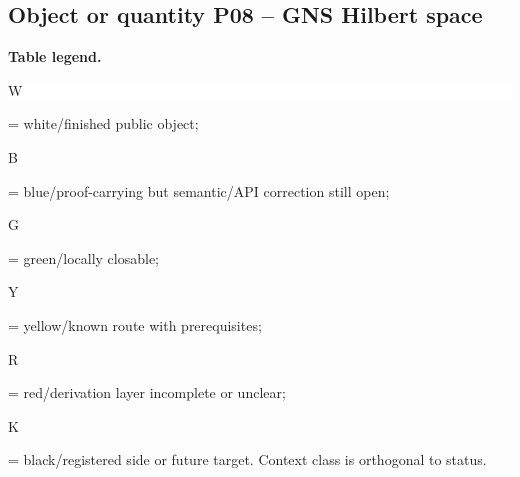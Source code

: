 \subsection*{Object or quantity P08 -- GNS Hilbert space}
\hypertarget{objproof:P08}{}
\par\smallskip\noindent\begin{minipage}{0.99\linewidth}\footnotesize\raggedright\textbf{Table legend.} \colorbox{white}{\strut W} = white/finished public object; \colorbox{cyan!20}{\strut B} = blue/proof-carrying but semantic/API correction still open; \colorbox{green!18}{\strut G} = green/locally closable; \colorbox{yellow!25}{\strut Y} = yellow/known route with prerequisites; \colorbox{red!20}{\strut R} = red/derivation layer incomplete or unclear; \colorbox{black!18}{\strut K} = black/registered side or future target. Context class is orthogonal to status.\end{minipage}\par\vspace{0.25em}
